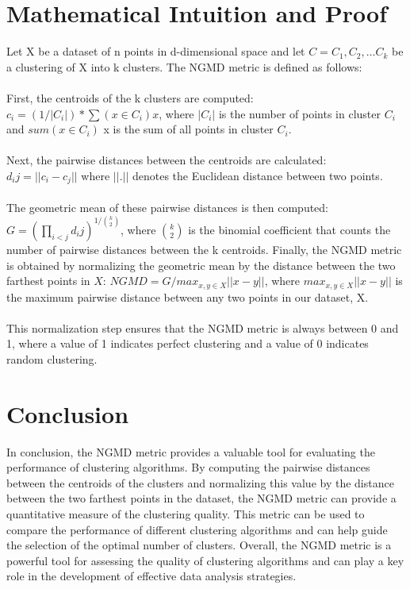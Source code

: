 \documentclass[12pt]{article}
\begin{document}
\section{Mathematical Intuition and Proof}

Let X be a dataset of n points in d-dimensional space and let $C = {C_1, C_2, \ldots C_k}$ be a clustering of X into k clusters. The NGMD metric is defined as follows:\\
\\
First, the centroids of the k clusters are computed:\\
$c_i = (1 / |C_i|) * \sum(x \in C_i) x$, where $|C_i|$ is the number of points in cluster $C_i$ and $sum(x \in C_i)$ x is the sum of all points in cluster $C_i$.\\
\\
Next, the pairwise distances between the centroids are calculated:\\
$d_ij = ||c_i - c_j||$ where $||.||$ denotes the Euclidean distance between two points.\\
\\
The geometric mean of these pairwise distances is then computed:\\
$G = (\prod_{i<j} d_ij)^{1 / {k \choose 2}}$, where $k \choose 2$ is the binomial coefficient that counts the number of pairwise distances between the k centroids.
Finally, the NGMD metric is obtained by normalizing the geometric mean by the distance between the two farthest points in $X$:
$NGMD = G / max_{x,y \in X} ||x - y||$, where $max_{x,y \in X} ||x - y||$ is the maximum pairwise distance between any two points in our dataset, X.\\
\\
This normalization step ensures that the NGMD metric is always between 0 and 1, where a value of 1 indicates perfect clustering and a value of 0 indicates random clustering.


\section{Conclusion}

In conclusion, the NGMD metric provides a valuable tool for evaluating the performance of clustering algorithms. By computing the pairwise distances between the centroids of the clusters and normalizing this value by the distance between the two farthest points in the dataset, the NGMD metric can provide a quantitative measure of the clustering quality. This metric can be used to compare the performance of different clustering algorithms and can help guide the selection of the optimal number of clusters. Overall, the NGMD metric is a powerful tool for assessing the quality of clustering algorithms and can play a key role in the development of effective data analysis strategies.
\end{document}
